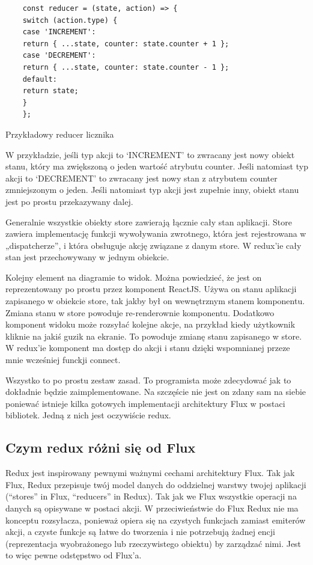 \begin{listing}
	\begin{verbatim}
	const reducer = (state, action) => {
	switch (action.type) {
	case 'INCREMENT':
	return { ...state, counter: state.counter + 1 };
	case 'DECREMENT':
	return { ...state, counter: state.counter - 1 };
	default:
	return state;
	}
	};
	\end{verbatim}
	\caption{Przykładowy reducer licznika} \label{listing:reducer}
\end{listing}

W przykładzie, jeśli typ akcji to `INCREMENT' to zwracany jest nowy obiekt stanu, który ma zwiększoną o jeden wartość atrybutu counter.
Jeśli natomiast typ akcji to `DECREMENT' to zwracany jest nowy stan z atrybutem counter zmniejszonym o jeden.
Jeśli natomiast typ akcji jest zupełnie inny, obiekt stanu jest po prostu przekazywany dalej.

Generalnie wszystkie obiekty store zawierają łącznie cały stan aplikacji.
Store zawiera implementację funkcji wywoływania zwrotnego, która jest rejestrowana w „dispatcherze”, i która obsługuje akcję związane z danym store.
W redux'ie cały stan jest przechowywany w jednym obiekcie.

Kolejny element na diagramie to widok. Można powiedzieć, że jest on reprezentowany po prostu przez komponent ReactJS\@.
Używa on stanu aplikacji zapisanego w obiekcie store, tak jakby był on wewnętrznym stanem komponentu.
Zmiana stanu w store powoduje re-renderownie komponentu.
Dodatkowo komponent widoku może rozsyłać kolejne akcje, na przykład kiedy użytkownik kliknie na jakiś guzik na ekranie.
To powoduje zmianę stanu zapisanego w store.
W redux'ie komponent ma dostęp do akcji i stanu dzięki wspomnianej przeze mnie wcześniej funckji connect.

Wszystko to po prostu zestaw zasad.
To programista może zdecydować jak to dokładnie będzie zaimplementowane.
Na szczęście nie jest on zdany sam na siebie poniewać istnieje kilka gotowych implementacji architektury Flux w postaci bibliotek.\cite{www_nafrontendzie}
Jedną z nich jest oczywiście redux.

\subsection{Czym redux różni się od Flux}

Redux jest inspirowany pewnymi ważnymi cechami architektury Flux.
Tak jak Flux, Redux przepisuje twój model danych do oddzielnej warstwy twojej aplikacji (“stores” in Flux, “reducers” in Redux).
Tak jak we Flux wszystkie operacji na danych są opisywane w postaci akcji.
W przeciwieństwie do Flux Redux nie ma konceptu rozsyłacza,
ponieważ opiera się na czystych funkcjach zamiast emiterów akcji,
a czyste funkcje są łatwe do tworzenia i nie potrzebują żadnej encji (reprezentacja wyobrażonego lub rzeczywistego obiektu) by zarządzać nimi.
Jest to więc pewne odstępstwo od Flux’a.\cite{www_nafrontendzie}

